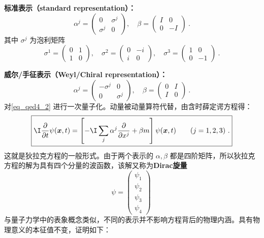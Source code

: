 \textbf{标准表示（standard representation）：}
\begin{equation}\label{eq_qed4_6}
\alpha^{j}=\left(\begin{array}{cc}
0 & \sigma^{j} \\
\sigma^{j} & 0
\end{array}\right), \quad \beta=\left(\begin{array}{rr}
I & 0 \\
0 & -I
\end{array}\right)~.
\end{equation}
其中 $\sigma^{j}$ 为泡利矩阵
\begin{equation}\label{eq_qed4_7}
\sigma^{1}=\left(\begin{array}{ll}
0 & 1 \\
1 & 0
\end{array}\right), \quad \sigma^{2}=\left(\begin{array}{rr}
0 & -i \\
i & 0
\end{array}\right), \quad \sigma^{3}=\left(\begin{array}{rr}
1 & 0 \\
0 & -1
\end{array}\right)~.
\end{equation}

\textbf{威尔/手征表示（Weyl/Chiral representation）：}
\begin{equation}\label{eq_qed4_8}
\alpha^{j}=\left(\begin{array}{cc}
-\sigma^{j} & 0 \\
0 & \sigma^{j}
\end{array}\right), \quad \beta=\left(\begin{array}{cc}
0 & I \\
I & 0
\end{array}\right)~.
\end{equation}
对\autoref{eq_qed4_2} 进行一次量子化。动量被动量算符代替，由含时薛定谔方程得：\begin{equation}\label{eq_qed4_9}
\boxed{ \I \frac{\partial}{\partial t} \psi(\boldsymbol{x}, t)=\left[- \I \sum_{j} \alpha^{j} \frac{\partial}{\partial x^{j}}+\beta m\right] \psi(\boldsymbol{x}, t) \qquad (j=1,2,3)~.}
\end{equation}
这就是狄拉克方程的一般形式。由于两个表示的 $\alpha,\beta$ 都是四阶矩阵，所以狄拉克方程的解为具有四个分量的波函数，该解又称为\textbf{Dirac旋量}
\begin{equation}\label{eq_qed4_10}
\psi=\left(\begin{array}{l}
\psi_{1} \\
\psi_{2} \\
\psi_{3} \\
\psi_{4}
\end{array}\right)~
\end{equation}
与量子力学中的表象概念类似，不同的表示并不影响方程背后的物理内涵。具有物理意义的本征值不变，证明如下：


